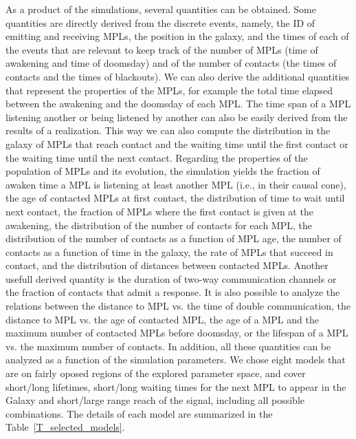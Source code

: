 As a product of the simulations, several quantities can be obtained.
%
Some quantities are directly derived from the discrete events, namely,
the ID of emitting and receiving MPLs, the position in the galaxy, and
the times of each of the events that are relevant to keep track of the
number of MPLs (time of awakening and time of doomsday) and of the
number of contacts (the times of contacts and the times of blackouts).
%
We can also derive the additional quantities that represent the
properties of the MPLs, for example the total time elapsed between the
awakening and the doomsday of each MPL.
%
The time span of a MPL listening another or being listened by another
can also be easily derived from the results of a realization.
%
This way we can also compute the distribution in the galaxy of MPLs
that reach contact and the waiting time until the first contact or the
waiting time until the next contact.
%
Regarding the properties of the population of MPLs and its evolution,
the simulation yields the fraction of awaken time a MPL is listening
at least another MPL (i.e., in their causal cone), the age of
contacted MPLs at first contact, the distribution of time to wait
until next contact, the fraction of MPLs where the first contact is
given at the awakening, the distribution of the number of contacts for
each MPL, the distribution of the number of contacts as a function of
MPL age, the number of contacts as a function of time in the galaxy,
the rate of MPLs that succeed in contact, and the distribution of
distances between contacted MPLs.
%
Another usefull derived quantity is the duration of two-way
communication channels or the fraction of contacts that admit a
response.
% 
It is also possible to analyze the relations between the distance to
MPL vs. the time of double communication, the distance to MPL vs. the
age of contacted MPL, the age of a MPL and the maximum number of
contacted MPLs before doomsday, or the lifespan of a MPL vs. the
maximum number of contacts.
%
In addition, all these quantities can be analyzed as a function of the
simulation parameters.
%
We chose eight models that are on fairly oposed regions of the
explored parameter space, and cover short/long lifetimes, short/long
waiting times for the next MPL to appear in the Galaxy and short/large
range reach of the signal, including all possible combinations.
%
The details of each model are summarized in the
Table~\ref{T_selected_models}.



